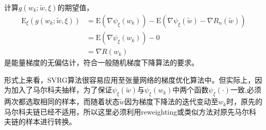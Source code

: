计算$g(w_k;\tilde{w},\xi)$的期望值，
\begin{align*}
\mathrm{E}_\xi\!\left(g(w_k;\tilde{w},\xi)\right) &= \mathrm{E}(\nabla\psi_\xi(w_k))-\mathrm{E}\left( \nabla\psi_\xi(\tilde{w})-\nabla R_n(\tilde{w}) \right)\\
		&= \mathrm{E}(\nabla\psi_\xi(w_k)) - 0\\
		&= \nabla R(w_k)
\end{align*}
是能量梯度的无偏估计，符合一般随机梯度下降算法的要求。

形式上来看，SVRG算法很容易应用至张量网络的梯度优化算法中。但实际上，因为加入了马尔科夫抽样，为了保证$\psi_{\xi}(\tilde{w})$与$\psi_{\xi}(w_k)$中两个函数$\psi_\xi(\cdot)$一致,必须两次都选取相同的样本，而随着状态$\tilde{w}$因为梯度下降法的迭代变动至$w_k$时，原先的马尔科夫链已经不适用，所以这里必须利用reweighting或类似方法对原先马尔科夫链的样本进行转换。

